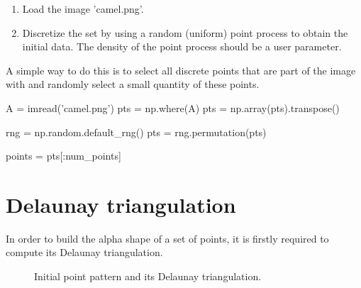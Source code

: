 \begin{qbox}
\begin{enumerate}
	\item Load the image 'camel.png'.
	\item Discretize the set by using a random (uniform) point process to obtain the initial data. The density of the point process should be a user parameter.
\end{enumerate}
\end{qbox}

\begin{pcomment}
A simple way to do this is to select all discrete points that are part of the image with  and randomly select a small quantity of these points.

\begin{python}
A = imread('camel.png')
pts = np.where(A)
pts = np.array(pts).transpose()

rng = np.random.default_rng()
pts = rng.permutation(pts)

points = pts[:num_points]
\end{python}

\end{pcomment}


\section{Delaunay triangulation}

In order to build the alpha shape of a set of points, it is firstly required to compute its Delaunay triangulation.
\begin{figure}[htbp]
\centering
{}\hspace{.5cm}
\hspace{.5cm}
\caption{Initial point pattern and its Delaunay triangulation.}
\label{fig:alphashapes:delaunay}
\end{figure}

